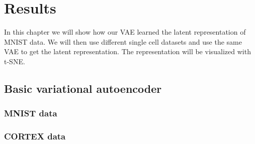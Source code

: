 \chapter{Results}
\label{chap:results}

In this chapter we will show how our VAE learned the latent representation of MNIST data.
We will then use different single cell datasets and use the same VAE to get the latent representation.
The representation will be visualized with t-SNE.

\section{Basic variational autoencoder}
\subsection{MNIST data}
\subsection{CORTEX data}